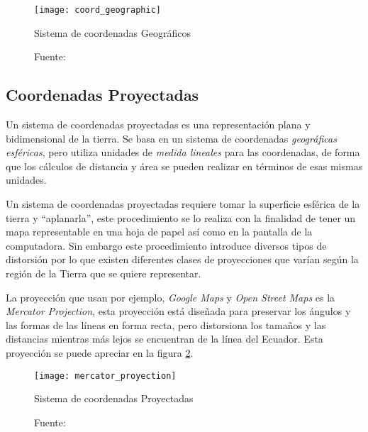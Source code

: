         \begin{figure}[H]
          \begin{center}
            \texttt{[image: coord\_geographic]}
            \caption{Sistema de coordenadas Geográficos}
            \label{fig:coord_geographic}
            \caption*{Fuente: \cite{coords2009} }
          \end{center}
        \end{figure}





      \subsection{Coordenadas Proyectadas} %
      \label{sub:coordenadas_proyectadas}
        Un sistema de coordenadas proyectadas es una representación plana y bidimensional de la  tierra. Se basa en un sistema de coordenadas \emph{geográficas esféricas}, pero utiliza unidades de \emph{medida lineales} para las coordenadas, de forma que los cálculos de distancia y área se pueden realizar en términos de esas mismas unidades. \cite{projected}

        Un sistema de coordenadas proyectadas requiere tomar la superficie esférica de la tierra y ``aplanarla'', este procedimiento se lo realiza con la finalidad de tener un mapa representable en una hoja de papel así como en la pantalla de la computadora. Sin embargo este procedimiento introduce diversos tipos de distorsión por lo que existen diferentes clases de proyecciones que varían según la región de la Tierra que se quiere representar.

        La proyección que usan por ejemplo, \emph{Google Maps} y \emph{Open Street Maps} es la \emph{Mercator Projection}, esta proyección está diseñada para preservar los ángulos y las formas de las líneas en forma recta, pero distorsiona los tamaños y las distancias mientras más lejos se encuentran de la línea del Ecuador. Esta proyección se puede apreciar en la figura \ref{fig:mercator_proyection}. \cite{gmaps_osm}


        \begin{figure}[H]
          \begin{center}
            \texttt{[image: mercator\_proyection]}
          \end{center}
          \caption{Sistema de coordenadas Proyectadas}
          \label{fig:mercator_proyection}
          \caption*{Fuente: \cite{coords2009} }
        \end{figure}


